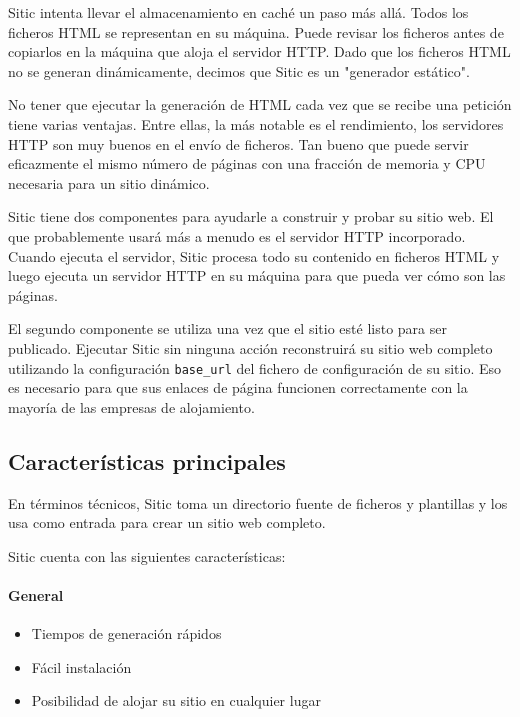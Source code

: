 Sitic intenta llevar el almacenamiento en caché un paso más allá. Todos los ficheros HTML se representan en su máquina.
Puede revisar los ficheros antes de copiarlos en la máquina que aloja el servidor HTTP. Dado que los ficheros HTML
no se generan dinámicamente, decimos que Sitic es un "generador estático".

No tener que ejecutar la generación de HTML cada vez que se recibe una petición tiene varias ventajas. Entre ellas,
la más notable es el rendimiento, los servidores HTTP son muy buenos en el envío de ficheros. Tan bueno que puede
servir eficazmente el mismo número de páginas con una fracción de memoria y CPU necesaria para un sitio dinámico.

Sitic tiene dos componentes para ayudarle a construir y probar su sitio web. El que probablemente usará más a menudo es el
servidor HTTP incorporado. Cuando ejecuta el servidor, Sitic procesa todo su contenido en ficheros HTML y luego ejecuta
un servidor HTTP en su máquina para que pueda ver cómo son las páginas.

El segundo componente se utiliza una vez que el sitio esté listo para ser publicado.
Ejecutar Sitic sin ninguna acción reconstruirá su sitio web completo utilizando la configuración \texttt{base\_url} 
del fichero de configuración de su sitio. Eso es necesario para que sus enlaces de página funcionen correctamente 
con la mayoría de las empresas de alojamiento.

\subsection{Características principales}

En términos técnicos, Sitic toma un directorio fuente de ficheros 
y plantillas y los usa como entrada para crear un sitio web completo.

Sitic cuenta con las siguientes características:

\paragraph{General}

\begin{itemize}
\item Tiempos de generación rápidos
\item Fácil instalación
\item Posibilidad de alojar su sitio en cualquier lugar
\end{itemize}

